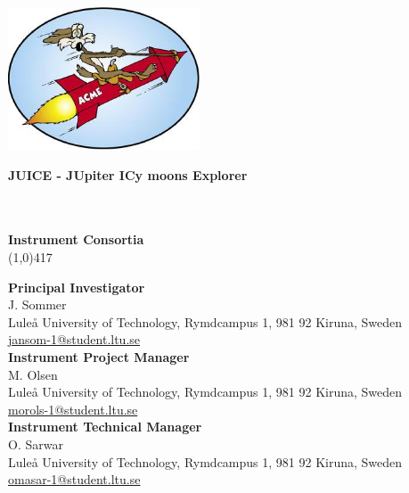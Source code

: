 \begin{titlepage}
\begin{center}
\begin{flushright}
\includegraphics[height=120pt]{figures/Logo3.jpg}
\end{flushright}
%
\begin{flushleft}
\vspace{5mm}
\Large \bfseries{JUICE - JUpiter ICy moons Explorer}\\
\Large \bfseries{\doctitle}\\ 
\Large \bfseries{\docsubtitle}\\
%
\vspace{15mm}
%
%
%
\begin{normalsize}
%
\textbf{Instrument Consortia}\\
\vspace{-0.9em}
\line(1,0){417}\\
%
\end{normalsize}
%
\begin{small}
\textbf{Principal Investigator}\\
J. Sommer\\
Lule\r{a} University of Technology, Rymdcampus 1, 981 92 Kiruna, Sweden\\
\href{mailto:jansom-1@student.ltu.se}{jansom-1@student.ltu.se}\\[5mm]
%
\textbf{Instrument Project Manager}\\
M. Olsen\\
Lule\r{a} University of Technology, Rymdcampus 1, 981 92 Kiruna, Sweden\\
\href{mailto:morols-1@student.ltu.se}{morols-1@student.ltu.se}\\[5mm]
%
\textbf{Instrument Technical Manager}\\
O. Sarwar\\
Lule\r{a} University of Technology, Rymdcampus 1, 981 92 Kiruna, Sweden\\
\href{mailto:omasar-1@student.ltu.se}{omasar-1@student.ltu.se}\\
\end{small}

\end{flushleft}
\end{center}
\end{titlepage}
